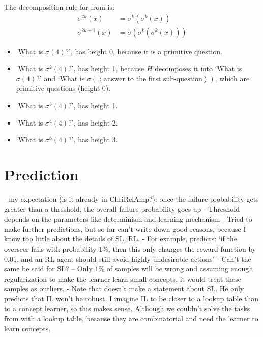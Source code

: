 \documentclass{farlamp}
\begin{document}
\begin{example}
    The decomposition rule for  from \textcite[table
    3]{CSASupAmp} is:
    \begin{align}
        \sigma^{2k}(x) &= \sigma^k(\sigma^k(x)) \\
        \sigma^{2k+1}(x) &= \sigma(\sigma^k(\sigma^k(x)))
    \end{align}

    \begin{itemize}
        \item ‘What is $\sigma(4)$?’, has height 0, because it is a primitive
            question.
        \item ‘What is $\sigma^2(4)$?’, has height 1, because $H$ decomposes it
            into ‘What is $\sigma(4)$?’ and ‘What is $\sigma(\left<\text{answer
            to the first sub-question}\right>)$, which are primitive questions
            (height 0).
        \item ‘What is $\sigma^3(4)$?’, has height 1.
        \item ‘What is $\sigma^4(4)$?’, has height 2.
        \item ‘What is $\sigma^8(4)$?’, has height 3.
    \end{itemize}
\end{example}


\section{Prediction}
\label{sec:prediction}

- my expectation (is it already in ChriRelAmp?): once the failure probability
gets greater than a threshold, the overall failure probability goes up
- Threshold depends on the parameters like determinism and learning
mechanism
- Tried to make further predictions, but so far can't write down good
reasons, because I know too little about the details of SL, RL.
- For example, \textcite{ChriRelAmp} predicts: ‘if the overseer fails with
probability $1 \%$, then this only changes the reward function by 0.01, and an
RL agent should still avoid highly undesirable actions’
- Can't the same be said for SL? – Only $1 \%$ of samples will be wrong and
assuming enough regularization to make the learner learn small concepts, it
would treat these samples as outliers.
- Note that \textcite{ChriRelAmp} doesn't make a statement about SL. He only
predicts that IL won't be robust. I imagine IL to be closer to a lookup table
than to a concept learner, so this makes sense. Although we couldn't solve the
tasks from \textcite{CSASupAmp} with a lookup table, because they are
combinatorial and need the learner to learn concepts.
\end{document}
